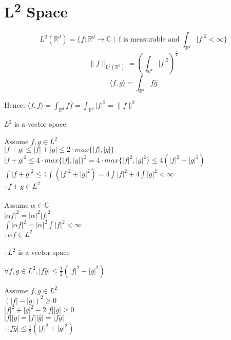 \documentclass[letterpaper,12pt,fleqn]{article}
\newcommand{\Rd}{\mathbb{R}^d}
\newcommand{\LtwoRd}{L^2(\Rd)}
\newcommand{\abs}[1]{\left|#1\right|}
\newcommand{\norm}[1]{\lVert#1\rVert}
\newcommand{\inner}[2]{\langle#1,#2\rangle}
\newcommand{\conj}[1]{\bar{#1}}
\begin{document}
\section*{L\textsuperscript{2} Space}

\begin{definition}
\[\LtwoRd=\{f:\Rd\to\mathbb{C}\mid
    \ \mbox{f is measurable and}\ \int_{\Rd}|f|^2<\infty\}\]
\[\norm{f}_{\LtwoRd}=\left(\int_{\Rd}|f|^2\right)^{\frac{1}{2}}\]
\[\inner{f}{g}=\int_{\Rd}f\conj{g}\]
\end{definition}

Hence: $\inner{f}{f}=\int_{\Rd}f\conj{f}=\int_{\Rd}|f|^2=\norm{f}^2$

\begin{theorem}
$L^2$ is a vector space.
\end{theorem}

\begin{theproof}
Assume $f,g\in L^2$ \\
$\abs{f+g}\le\abs{f}+\abs{g}\le2\cdot max\{\abs{f},\abs{g}\}$ \\
$\abs{f+g}^2\le4\cdot max\{\abs{f},\abs{g}\}^2=
    4\cdot max\{\abs{f}^2,\abs{g}^2\}\le4(\abs{f}^2+\abs{g}^2)$ \\
$\int\abs{f+g}^2\le4\int(\abs{f}^2+\abs{g}^2)=
    4\int\abs{f}^2+4\int\abs{g}^2<\infty$ \\
$\therefore f+g\in L^2$ \\
\\
Assume $\alpha\in\mathbb{C}$ \\
$\abs{\alpha f}^2=\abs{\alpha}^2\abs{f}^2$ \\
$\int\abs{\alpha f}^2=\abs{\alpha}^2\int\abs{f}^2<\infty$ \\
$\therefore \alpha f\in L^2$ \\
\\
$\therefore L^2$ is a vector space \\
\end{theproof}

\begin{lemma}
$\forall f,g\in L^2, \abs{f\conj{g}}\le
\frac{1}{2}\left(\abs{f}^2+\abs{g}^2\right)$
\end{lemma}

\begin{theproof}
Assume $f,g\in L^2$ \\
$\left(\abs{f}-\abs{g}\right)^2\ge0$ \\
$\abs{f}^2+\abs{g}^2-2\abs{f}\abs{g}\ge0$ \\
$\abs{f}\abs{g}=\abs{f}\abs{\conj{g}}=\abs{f\conj{g}}$ \\
$\therefore \abs{f\conj{g}}\le\frac{1}{2}\left(\abs{f}^2+\abs{g}^2\right)$
\end{theproof}
\end{document}
